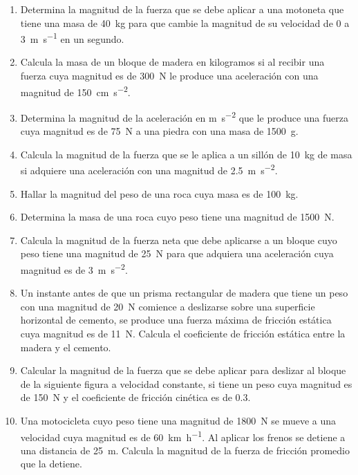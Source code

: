 \documentclass[14pt]{extarticle}
\begin{document}
\begin{enumerate}
\item Determina la magnitud de la fuerza que se debe aplicar a una motoneta que tiene una masa de \SI{40}{\kilogram} para que cambie la magnitud de su velocidad de $0$ a \SI{3}{\meter\per\second} en un segundo.
\item Calcula la masa de un bloque de madera en kilogramos si al recibir una fuerza cuya magnitud es de \SI{300}{\newton} le produce una aceleración con una magnitud de \SI{150}{\centi\meter\per\square\second}.
\item Determina la magnitud de la aceleración en \unit{\meter\per\square\second} que le produce una fuerza cuya magnitud es de \SI{75}{\newton} a una piedra con una masa de \SI{1500}{\gram}.
\item Calcula la magnitud de la fuerza que se le aplica a un sillón de \SI{10}{\kilo\gram} de masa si  adquiere una aceleración con una magnitud de \SI{2.5}{\meter\per\square\second}.
\item Hallar la magnitud del peso de una roca cuya masa es de \SI{100}{\kilo\gram}.
\item Determina la masa de una roca cuyo peso tiene una magnitud de \SI{1500}{\newton}.
\item Calcula la magnitud de la fuerza neta que debe aplicarse a un bloque cuyo peso tiene una magnitud de \SI{25}{\newton} para que adquiera una aceleración cuya magnitud es de \SI{3}{\meter\per\square\second}.
\item Un instante antes de que un prisma rectangular de madera que tiene un peso con una magnitud de \SI{20}{\newton} comience a deslizarse sobre una superficie horizontal de cemento, se produce una fuerza máxima de fricción estática cuya magnitud es de \SI{11}{\newton}. Calcula el coeficiente de fricción estática entre la madera y el cemento.
\item Calcular la magnitud de la fuerza que se debe aplicar para deslizar al bloque de la siguiente figura a velocidad constante, si tiene un peso cuya magnitud es de \SI{150}{N} y el coeficiente de fricción cinética es
de \num{0.3}.
\begin{figure}[H]
    \centering
\end{figure}
\item Una motocicleta cuyo peso tiene una magnitud de \SI{1800}{\newton} se mueve a una velocidad cuya magnitud es de \SI{60}{\kilo\meter\per\hour}. Al aplicar los frenos se detiene a una distancia de \SI{25}{\meter}. Calcula la magnitud de la fuerza de fricción promedio que la detiene.
\end{enumerate}
\end{document}
